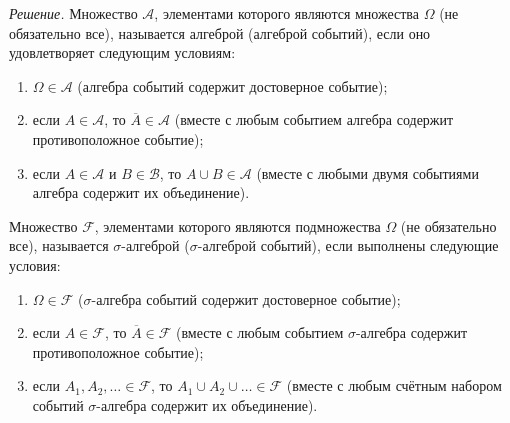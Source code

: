 \textit{Решение.} Множество $ \mathcal{A} $, элементами которого являются множества $ \Omega $ (не обязательно все), называется алгеброй (алгеброй событий), если оно удовлетворяет следующим условиям:
\begin{enumerate}
\item $ \Omega \in \mathcal{A} $ (алгебра событий содержит достоверное событие);
\item если $A \in \mathcal{A} $, то $ \overline{A} \in \mathcal{A} $ (вместе с любым событием алгебра содержит противоположное событие);
\item если $A \in \mathcal{A} $ и $B \in \mathcal{B} $, то $A \cup B \in \mathcal{A} $
(вместе с любыми двумя событиями алгебра содержит их объединение).
\end{enumerate}

Множество $ \mathcal{F} $,
элементами которого являются подмножества $ \Omega $ (не обязательно все),
называется $ \sigma $-алгеброй ($ \sigma $-алгеброй событий), если выполнены следующие условия:
\begin{enumerate}
\item $ \Omega \in \mathcal{F} $ ($ \sigma $-алгебра событий содержит достоверное событие);
\item если $A \in \mathcal{F} $,
то $ \overline{A} \in \mathcal{F} $ (вместе с любым событием $ \sigma $-алгебра содержит противоположное событие);
\item если $A_1, A_2, \dotsc \in \mathcal{F} $, то $A_1 \cup A_2 \cup \dotsc \in \mathcal{F} $
(вместе с любым счётным набором событий $ \sigma $-алгебра содержит их объединение).
\end{enumerate}

